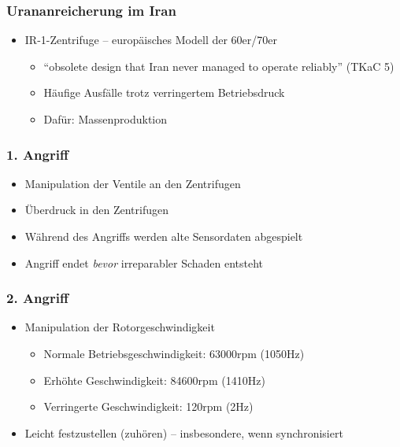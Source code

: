 \documentclass{beamer}
\begin{document}
\begin{frame}
  \frametitle{Urananreicherung im Iran}
  \begin{itemize}
    \item IR-1-Zentrifuge – europäisches Modell der 60er/70er
      \begin{itemize}
        \item ``obsolete design that Iran never managed to operate reliably'' (TKaC 5)
        \item Häufige Ausfälle trotz verringertem Betriebsdruck
        \item Dafür: Massenproduktion
      \end{itemize}
  \end{itemize}
\end{frame}

\begin{frame}
  \frametitle{1. Angriff}
  \begin{itemize}
    \item Manipulation der Ventile an den Zentrifugen
    \item Überdruck in den Zentrifugen
    \item Während des Angriffs werden alte Sensordaten abgespielt
    \item Angriff endet \emph{bevor} irreparabler Schaden entsteht
  \end{itemize}
\end{frame}

\begin{frame}
  \frametitle{2. Angriff}
  \begin{itemize}
    \item Manipulation der Rotorgeschwindigkeit
      \begin{itemize}
        \item Normale Betriebsgeschwindigkeit: 63000rpm (1050Hz)
        \item Erhöhte Geschwindigkeit: 84600rpm (1410Hz)
        \item Verringerte Geschwindigkeit: 120rpm (2Hz)
      \end{itemize}
    \item Leicht festzustellen (zuhören) – insbesondere, wenn synchronisiert
  \end{itemize}
\end{frame}
\end{document}
